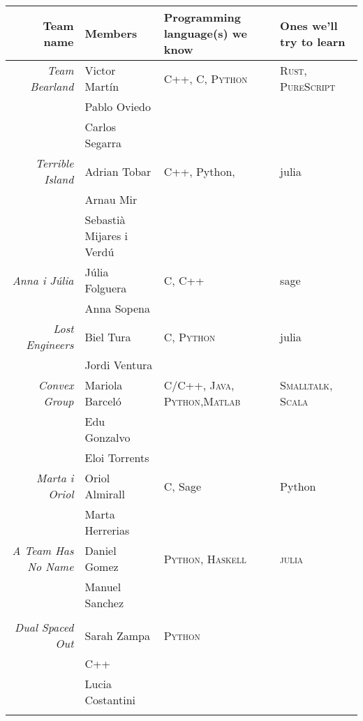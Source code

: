 \documentclass[11pt]{amsart}
\begin{document}
\bigskip
\begin{center}
  \begin{tabular}[c]{r|l|l|l}
    Team name
    & Members
    & Programming language(s) we know
    & Ones we'll try to learn
    \\\hline
    \emph{Team Bearland}
    & Victor Mart\'in
      & \textsc{C++}, \textsc{C}, \textsc{Python} & \textsc{Rust}, \textsc{PureScript} \\
      & Pablo Oviedo & \\
      & Carlos Segarra &               
    \\\hline
    \emph{Terrible Island}
    & Adrian Tobar
    & C++, Python, & julia \\
    & Arnau Mir & \\
    & Sebastià Mijares i Verdú &
    \\\hline

                  
    

    \emph{Anna i Júlia}
    & Júlia Folguera
    & C, C++  & sage  \\
    & Anna Sopena &
    \\\hline
    \emph{Lost Engineers}
    & Biel Tura
    & \textsc{C}, \textsc{Python}  & julia  \\
    & Jordi Ventura &
    \\\hline



    \emph{Convex Group}
    & Mariola Barceló
    & \textsc{C/C++}, \textsc{Java}, \textsc{Python},\textsc{Matlab}  &  \textsc{Smalltalk}, \textsc{Scala}   \\
    & Edu Gonzalvo & \\
    & Eloi Torrents &  
    \\\hline
    
    \emph{Marta i Oriol}
    & Oriol Almirall
    & \textsc{C}, Sage & Python\\
    & Marta Herrerias &
    \\\hline

    \emph{A Team Has No Name}
    & Daniel Gomez 
    &  \textsc{Python},  \textsc{Haskell}  &  \textsc{julia} \\
    & Manuel Sanchez \\  
	\\\hline
	

	\emph{Dual Spaced Out}
    & Sarah Zampa 
    &  \textsc{Python} \\
    &  \textsc{C++} \\
    & Lucia Costantini \\  
	\\\hline
	

  \end{tabular}
\end{center}
\end{document}
